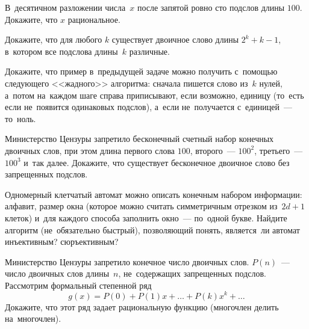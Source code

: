 


\begin{problems}

\item
В~десятичном разложении числа~$x$ после запятой ровно сто подслов длины $100$.
Докажите, что $x$ рациональное.

\item
Докажите, что для любого $k$ существует двоичное слово
длины $2^{k} + k - 1$, в~котором все подслова длины~$k$ различные.

\item
Докажите, что пример в~предыдущей задаче можно получить с~помощью следующего
<<жадного>> алгоритма:
сначала пишется слово из~$k$ нулей, а~потом на~каждом шаге справа приписывают,
если возможно, единицу (то~есть если не~появится одинаковых подслов), а~если
не~получается с~единицей~--- то~ноль.

\item
Министерство Цензуры запретило бесконечный счетный набор конечных двоичных
слов, при этом длина первого слова $100$, второго~--- $100^2$, третьего~---
$100^3$ и~так далее.
Докажите, что существует бесконечное двоичное слово без запрещенных подслов.

\item
Одномерный клетчатый автомат можно описать конечным набором информации:
алфавит, размер окна
(которое можно считать симметричным отрезком из~$2 d + 1$ клеток)
и~для каждого способа заполнить окно~--- по~одной букве.
Найдите алгоритм (не~обязательно быстрый), позволяющий понять, является~ли
автомат
\\
\subproblem
инъективным?
\qquad
\subproblem
сюръективным?

\item
Министерство Цензуры запретило конечное число двоичных слов.
$P(n)$~--- число двоичных слов длины~$n$, не~содержащих запрещенных подслов.
Рассмотрим формальный степенной ряд
\[
    g(x) = P(0) + P(1) x + \ldots + P(k) x^k + \ldots
\]
Докажите, что этот ряд задает рациональную функцию (многочлен делить
на~многочлен).

\end{problems}

